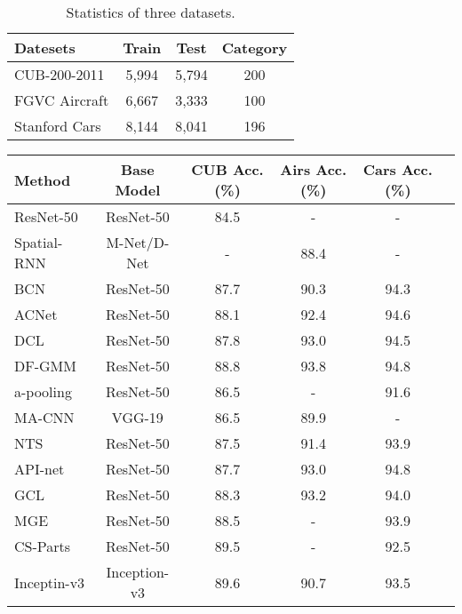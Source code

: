 \documentclass[10pt,twocolumn,letterpaper]{article}
\begin{document}
\begin{table}
\begin{center}
\begin{tabular}{|l|c|c|c|}
\hline
Datesets & Train & Test & Category \\
\hline\hline
CUB-200-2011 & 5,994 & 5,794 & 200 \\
\hline
FGVC Aircraft & 6,667 & 3,333 & 100 \\
\hline
Stanford Cars & 8,144 & 8,041 & 196 \\
\hline
\end{tabular}
\end{center}
\caption{Statistics of three datasets.}
\end{table}


\begin{table*}
\begin{center}
\begin{tabular}{|l|c|c|c|c|c|}
\hline
Method & Base Model  & CUB Acc.(\%) & Airs Acc.(\%) &  Cars Acc.(\%) \\
\hline
\hline
ResNet-50\cite{li2017dynamic}  & ResNet-50  & 84.5 & - & - \\
\hline
Spatial-RNN\cite{wu2018deep} & M-Net/D-Net & - & 88.4 & - \\ 
\hline
BCN\cite{Dubey_2018_ECCV} & ResNet-50 & 87.7 & 90.3 & 94.3 \\
\hline
ACNet\cite{ji2020attention} & ResNet-50 & 88.1 & 92.4 & 94.6 \\
\hline
DCL\cite{chen2019destruction} & ResNet-50 & 87.8 & 93.0 & 94.5 \\
\hline
DF-GMM\cite{WangWYLLL20} & ResNet-50 & 88.8 & 93.8 & 94.8 \\
\hline
a-pooling\cite{SimonRDD20} & ResNet-50  &  86.5 & - & 91.6 \\
\hline
MA-CNN\cite{ZhengFML17}& VGG-19 &  86.5 & 89.9 & - \\
\hline
NTS\cite{YangLWHGW18} & ResNet-50 &  87.5 & 91.4 & 93.9 \\
\hline
API-net\cite{ZhuangW020} &ResNet-50  & 87.7 & 93.0 & 94.8 \\
\hline
GCL\cite{WangWLDL20} & ResNet-50 & 88.3 & 93.2 & 94.0 \\
\hline
MGE\cite{zhang2019learning} & ResNet-50 & 88.5 & - & 93.9  \\
\hline
CS-Parts\cite{korsch2019classification} & ResNet-50  &  89.5 & - & 92.5 \\
\hline
Inceptin-v3\cite{cui2018large} & Inception-v3   & 89.6 & 90.7 & 93.5 \\

\end{tabular}
\end{center}
\end{table*}
\end{document}
